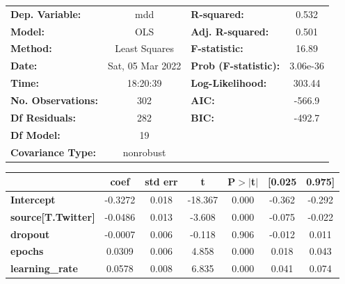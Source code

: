 \begin{center}
\begin{tabular}{lclc}
\toprule
\textbf{Dep. Variable:}                   &       mdd        & \textbf{  R-squared:         } &     0.532   \\
\textbf{Model:}                           &       OLS        & \textbf{  Adj. R-squared:    } &     0.501   \\
\textbf{Method:}                          &  Least Squares   & \textbf{  F-statistic:       } &     16.89   \\
\textbf{Date:}                            & Sat, 05 Mar 2022 & \textbf{  Prob (F-statistic):} &  3.06e-36   \\
\textbf{Time:}                            &     18:20:39     & \textbf{  Log-Likelihood:    } &    303.44   \\
\textbf{No. Observations:}                &         302      & \textbf{  AIC:               } &    -566.9   \\
\textbf{Df Residuals:}                    &         282      & \textbf{  BIC:               } &    -492.7   \\
\textbf{Df Model:}                        &          19      & \textbf{                     } &             \\
\textbf{Covariance Type:}                 &    nonrobust     & \textbf{                     } &             \\
\bottomrule
\end{tabular}
\begin{tabular}{lcccccc}
                                          & \textbf{coef} & \textbf{std err} & \textbf{t} & \textbf{P$> |$t$|$} & \textbf{[0.025} & \textbf{0.975]}  \\
\midrule
\textbf{Intercept}                        &      -0.3272  &        0.018     &   -18.367  &         0.000        &       -0.362    &       -0.292     \\
\textbf{source[T.Twitter]}                &      -0.0486  &        0.013     &    -3.608  &         0.000        &       -0.075    &       -0.022     \\
\textbf{dropout}                          &      -0.0007  &        0.006     &    -0.118  &         0.906        &       -0.012    &        0.011     \\
\textbf{epochs}                           &       0.0309  &        0.006     &     4.858  &         0.000        &        0.018    &        0.043     \\
\textbf{learning\_rate}                   &       0.0578  &        0.008     &     6.835  &         0.000        &        0.041    &        0.074     \\

\end{tabular}
\end{center}
